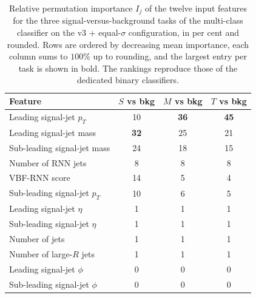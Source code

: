 \begin{table}[htbp]
  \centering
  \caption{Relative permutation importance $I_j$ of the twelve input features for the three signal-versus-background tasks of the multi-class classifier on the v3 + equal-$\sigma$ configuration, in per cent and rounded. Rows are ordered by decreasing mean importance, each column sums to $100\%$ up to rounding, and the largest entry per task is shown in bold. The rankings reproduce those of the dedicated binary classifiers.}
  \label{tab:fr_rank_mc_bkg}
  \begin{tabular}{|l|c|c|c|}
    \hline
    \textbf{Feature} & \textbf{$S$ vs bkg} & \textbf{$M$ vs bkg} & \textbf{$T$ vs bkg} \\
    \hline
    Leading signal-jet $p_T$      & 10 & \textbf{36} & \textbf{45} \\
    Leading signal-jet mass       & \textbf{32} & 25 & 21 \\
    Sub-leading signal-jet mass   & 24 & 18 & 15 \\
    Number of RNN jets            & 8  & 8  & 8 \\
    VBF-RNN score                 & 14 & 5  & 4 \\
    Sub-leading signal-jet $p_T$  & 10 & 6  & 5 \\
    Leading signal-jet $\eta$     & 1  & 1  & 1 \\
    Sub-leading signal-jet $\eta$ & 1  & 1  & 1 \\
    Number of jets                & 1  & 1  & 1 \\
    Number of large-$R$ jets      & 1  & 1  & 1 \\
    Leading signal-jet $\phi$     & 0  & 0  & 0 \\
    Sub-leading signal-jet $\phi$ & 0  & 0  & 0 \\
    \hline
  \end{tabular}
\end{table}

